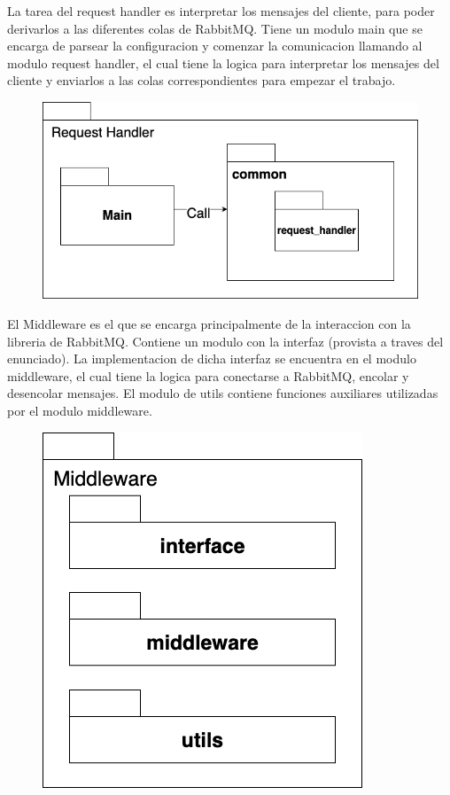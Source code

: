 \documentclass[titlepage,a4paper]{article}
\begin{document}
La tarea del request handler es interpretar los mensajes del cliente, para poder derivarlos a las diferentes colas de RabbitMQ. Tiene un modulo main que se encarga de parsear la configuracion y comenzar la comunicacion llamando al modulo request handler, el cual tiene la logica para interpretar los mensajes del cliente y enviarlos a las colas correspondientes para empezar el trabajo.
\begin{figure}[H]
    \centering
    \includegraphics[width=0.8\linewidth]{paquete-rh.png}
\end{figure}

El Middleware es el que se encarga principalmente de la interaccion con la libreria de RabbitMQ. Contiene un modulo con la interfaz (provista a traves del enunciado). La implementacion de dicha interfaz se encuentra en el modulo middleware, el cual tiene la logica para conectarse a RabbitMQ, encolar y desencolar mensajes. El modulo de utils contiene funciones auxiliares utilizadas por el modulo middleware.
\begin{figure}[H]
    \centering
    \includegraphics[width=0.8\linewidth]{paquete-middleware.png}
\end{figure}
\end{document}
